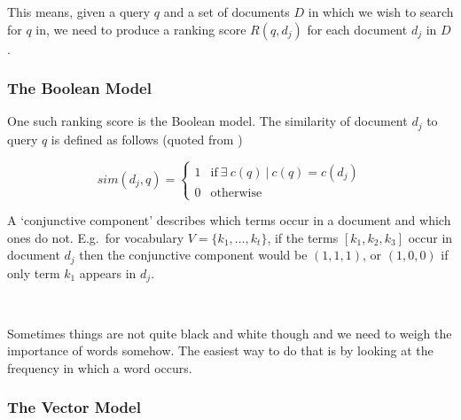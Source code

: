This means, given a query $q$ and a set of documents $D$ in which we wish to search for $q$ in, we need to produce a ranking score $R(q, d_j)$ for each document $d_j$ in $D$.





\subsubsection{The Boolean Model}

One such ranking score is the Boolean model. The similarity of document $d_j$ to query $q$ is defined as follows (quoted from \autocite[p.65]{Baeza-Yates2011})

\begin{equation}
  sim(d_j,q) =
  \begin{cases}
  1 & \text{if} \ \exists \ c(q) \ | \ c(q) = c(d_j)\\
  0 & \text{otherwise}
  \end{cases}
  \label{eq:sim}
\end{equation}

A `conjunctive component' describes which terms occur in a document and which ones do not. E.g.\ for vocabulary $V =\{k_{1},\ldots, k_{t}\}$, if the terms $[ k_{1},k_{2},k_{3}]$ occur in document $d_{j}$ then the conjunctive component would be $(1,1,1)$, or $(1,0,0)$ if only term $k_{1}$ appears in $d_{j}$.


\\

Sometimes things are not quite black and white though and we need to weigh the importance of words somehow. The easiest way to do that is by looking at the frequency in which a word occurs.



\subsubsection{The Vector Model}

